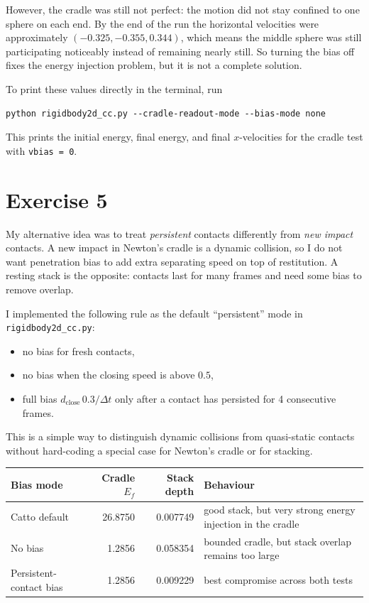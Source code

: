 \documentclass[11pt]{article}
\begin{document}
However, the cradle was still not perfect: the motion did not stay confined to one sphere on each end. By the end of the run the horizontal velocities were approximately $(-0.325,-0.355,0.344)$, which means the middle sphere was still participating noticeably instead of remaining nearly still. So turning the bias off fixes the energy injection problem, but it is not a complete solution.

To print these values directly in the terminal, run
\begin{verbatim}
python rigidbody2d_cc.py --cradle-readout-mode --bias-mode none
\end{verbatim}
This prints the initial energy, final energy, and final $x$-velocities for the cradle test with \texttt{vbias = 0}.

\section*{Exercise 5}
My alternative idea was to treat \emph{persistent} contacts differently from \emph{new impact} contacts. A new impact in Newton's cradle is a dynamic collision, so I do not want penetration bias to add extra separating speed on top of restitution. A resting stack is the opposite: contacts last for many frames and need some bias to remove overlap.

I implemented the following rule as the default ``persistent'' mode in \texttt{rigidbody2d\_cc.py}:
\begin{itemize}
    \item no bias for fresh contacts,
    \item no bias when the closing speed is above $0.5$,
    \item full bias $d_{\text{close}}\,0.3/\Delta t$ only after a contact has persisted for 4 consecutive frames.
\end{itemize}

This is a simple way to distinguish dynamic collisions from quasi-static contacts without hard-coding a special case for Newton's cradle or for stacking.

\begin{table}[h]
\centering
\small
\begin{tabular}{@{}lrrp{2.05in}@{}}
\toprule
Bias mode & Cradle $E_f$ & Stack depth & Behaviour \\
\midrule
Catto default & 26.8750 & 0.007749 & good stack, but very strong energy injection in the cradle \\
No bias & 1.2856 & 0.058354 & bounded cradle, but stack overlap remains too large \\
Persistent-contact bias & 1.2856 & 0.009229 & best compromise across both tests \\
\bottomrule
\end{tabular}
\normalsize
\end{table}
\end{document}
